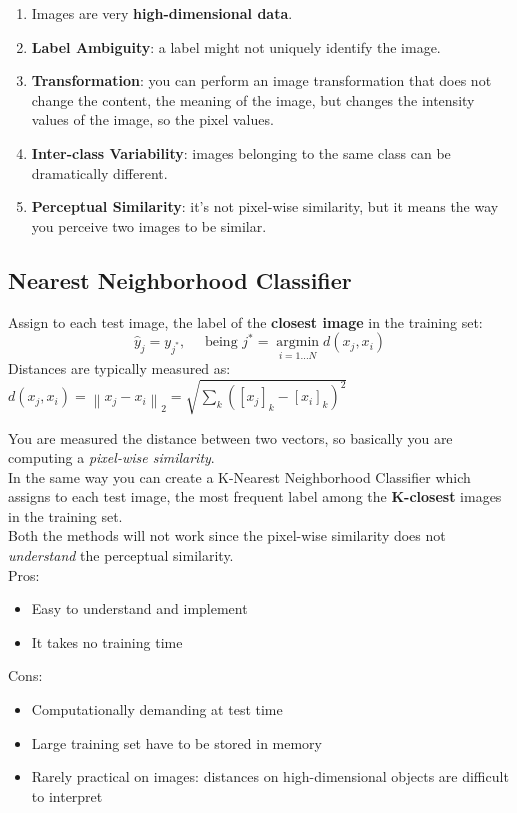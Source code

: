 \begin{enumerate}
    \item Images are very \textbf{high-dimensional data}.
    \item \textbf{Label Ambiguity}: a label might not uniquely identify the image.
    \item \textbf{Transformation}: you can perform an image transformation that does not change the content, the meaning of the image, but changes the intensity values of the image, so the pixel values.
    \item \textbf{Inter-class Variability}: images belonging to the same class can be dramatically different. 
    \item \textbf{Perceptual Similarity}: it's not pixel-wise similarity, but it means the way you perceive two images to be similar.
\end{enumerate}{}

\subsection{Nearest Neighborhood Classifier}
Assign to each test image, the label of the \textbf{closest image} in the training set: 
$$
\hat{y}_{j}=y_{j^{*}}, \quad \text { being } j^{*}=\underset{i=1 \ldots N}{\operatorname{argmin}} d\left(x_{j}, x_{i}\right)
$$
Distances are typically measured as: 
\(d\left(x_{j}, x_{i}\right)=\left\|x_{j}-x_{i}\right\|_{2}=\sqrt{\sum_{k}\left(\left[x_{j}\right]_{k}-\left[x_{i}\right]_{k}\right)^{2}}\)
 
You are measured the distance between two vectors, so basically you are computing a \textit{pixel-wise similarity}. \\
In the same way you can create a K-Nearest Neighborhood Classifier which assigns to each test image, the most frequent label among the \textbf{K-closest} images in the training set. \\
Both the methods will not work since the pixel-wise similarity does not \textit{understand} the perceptual similarity. \\
Pros: 
\begin{itemize}
    \item Easy to understand and implement
    \item It takes no training time
\end{itemize}{}
Cons: 
\begin{itemize}
    \item Computationally demanding at test time
    \item Large training set have to be stored in memory
    \item Rarely practical on images: distances on high-dimensional objects are difficult to interpret
\end{itemize}{}

